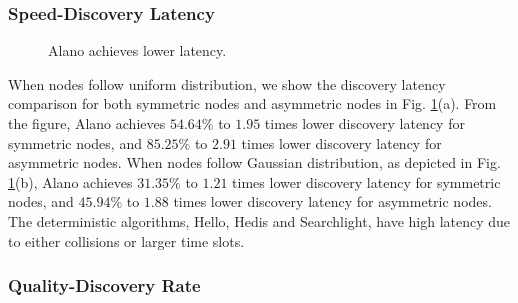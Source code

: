 \subsubsection{Speed-Discovery Latency}

\begin{figure}[!h]
\centering
{}
\hspace{0.01in}
\caption{Alano achieves lower latency.}
\label{fig_latency}
\end{figure}

When nodes follow uniform distribution, we show the discovery latency comparison for both symmetric nodes and asymmetric nodes in Fig. \ref{fig_latency}(a).
From the figure, Alano achieves $54.64\%$ to $1.95$ times lower discovery latency for symmetric nodes, and $85.25\%$ to $2.91$ times lower discovery latency for asymmetric nodes.
When nodes follow Gaussian distribution, as depicted in Fig. \ref{fig_latency}(b), 
Alano achieves $31.35\%$ to $1.21$ times lower discovery latency for symmetric nodes, 
and $45.94\%$ to $1.88$ times lower discovery latency for asymmetric nodes.
The deterministic algorithms, Hello, Hedis and Searchlight, have high latency due to either collisions or larger time slots. 


\subsubsection{Quality-Discovery Rate}




